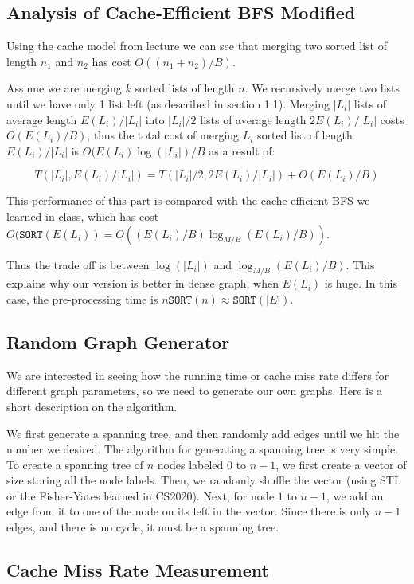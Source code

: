 \documentclass[12pt]{article}
\begin{document}
\subsection{Analysis of Cache-Efficient BFS Modified}

Using the cache model from lecture we can see that merging two sorted list of length $n_1$ and $n_2$ has cost $O((n_1+n_2)/B)$.

Assume we are merging $k$ sorted lists of length $n$. We recursively merge two lists until we have only 1 list left (as described in section 1.1). Merging $|L_i|$ lists of average length $E(L_i) / |L_i|$ into $|L_i|/2$ lists of average length $2E(L_i)/|L_i|$ costs $O(E(L_i)/B)$, thus the total cost of merging $L_i$ sorted list of length $E(L_i)/|L_i|$ is $O(E(L_i)\log(|L_i|) / B$ as a result of:

$$T(|L_i|, E(L_i)/|L_i|) = T(|L_i|/2, 2E(L_i)/|L_i|) + O(E(L_i)/B)$$

This performance of this part is compared with the cache-efficient BFS we learned in class, which has cost $O(\texttt{SORT}(E(L_i))=O((E(L_i)/B)\log_{M/B}(E(L_i)/B))$.

Thus the trade off is between $\log(|L_i|)$ and $\log_{M/B}{(E(L_i)/B)}$. This explains why our version is better in dense graph, when $E(L_i)$ is huge. In this case, the pre-processing time is $n\texttt{SORT}(n)\approx \texttt{SORT}(|E|)$.

\subsection{Random Graph Generator}

We are interested in seeing how the running time or cache miss rate differs for different graph parameters, so we need to generate our own graphs. Here is a short description on the algorithm.

We first generate a spanning tree, and then randomly add edges until we hit the number we desired. The algorithm for generating a spanning tree is very simple. To create a spanning tree of $n$ nodes labeled $0$ to $n-1$, we first create a vector of size storing all the node labels. Then, we randomly shuffle the vector (using STL or the Fisher-Yates learned in CS2020). Next, for node $1$ to $n-1$, we add an edge from it to one of the node on its left in the vector. Since there is only $n-1$ edges, and there is no cycle, it must be a spanning tree.

\subsection{Cache Miss Rate Measurement}
\end{document}
